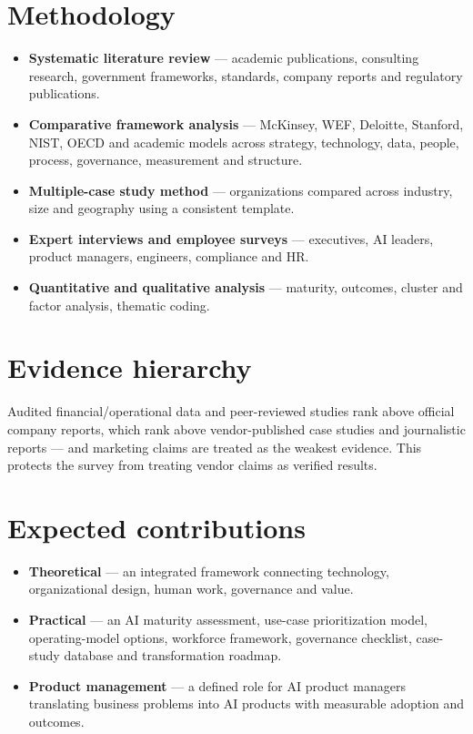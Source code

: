
\section{Methodology}

\begin{itemize}
  \item \textbf{Systematic literature review} — academic publications,
        consulting research, government frameworks, standards, company reports
        and regulatory publications.
  \item \textbf{Comparative framework analysis} — McKinsey, WEF, Deloitte,
        Stanford, NIST, OECD and academic models across strategy, technology,
        data, people, process, governance, measurement and structure.
  \item \textbf{Multiple-case study method} — organizations compared across
        industry, size and geography using a consistent template.
  \item \textbf{Expert interviews and employee surveys} — executives, AI
        leaders, product managers, engineers, compliance and HR.
  \item \textbf{Quantitative and qualitative analysis} — maturity, outcomes,
        cluster and factor analysis, thematic coding.
\end{itemize}

\section{Evidence hierarchy}

Audited financial/operational data and peer-reviewed studies rank above
official company reports, which rank above vendor-published case studies and
journalistic reports — and marketing claims are treated as the weakest
evidence. This protects the survey from treating vendor claims as verified
results.

\section{Expected contributions}

\begin{itemize}
  \item \textbf{Theoretical} — an integrated framework connecting technology,
        organizational design, human work, governance and value.
  \item \textbf{Practical} — an AI maturity assessment, use-case prioritization
        model, operating-model options, workforce framework, governance
        checklist, case-study database and transformation roadmap.
  \item \textbf{Product management} — a defined role for AI product managers
        translating business problems into AI products with measurable
        adoption and outcomes.
\end{itemize}
